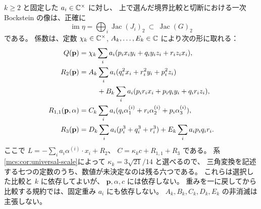 \begin{theorem}[一次像と七定数の比較形]
\label{lec:thm:seven-scalar-form}
$k\ge2$ と固定した $a_i\in\mathbb C^\times$ に対し、
上で選んだ境界比較と切断における一次 Bockstein の像は、正確に
\begin{equation}\label{lec:eq:bockstein-image}
             \operatorname{im}\eta
                =\bigoplus_i\operatorname{Jac}(J_i)_2
                \ \subset\ \operatorname{Jac}(G)_2
\end{equation}
である。
係数は、定数 $\chi_k\in\mathbb C^\times$, $A_k,\ldots,E_k\in\mathbb C$ により次の形に取れる：
\begin{align}
 Q(\mathbf p)
   &=\chi_k\sum_i a_i
       (p_ix_iy_i+q_iy_iz_i+r_iz_ix_i),\label{lec:eq:quadratic-image}\\
 R_2(\mathbf p)
   &=A_k\sum_i a_i(q_i^2x_i+r_i^2y_i+p_i^2z_i)\notag\\
   &\hspace{9mm}+B_k\sum_i a_i
       (p_ir_ix_i+p_iq_iy_i+q_ir_iz_i),\label{lec:eq:quadratic-correction}\\
 R_{1,1}(\mathbf p,\alpha)
   &=C_k\sum_i a_i
       (q_i\alpha_1^{(i)}+r_i\alpha_2^{(i)}+p_i\alpha_3^{(i)}),
       \label{lec:eq:mixed-correction}\\
 R_3(\mathbf p)
   &=D_k\sum_i a_i(p_i^3+q_i^3+r_i^3)
       +E_k\sum_i a_ip_iq_ir_i.\label{lec:eq:cubic-correction}
\end{align}
ここで $L=-\sum_i a_i\alpha^{(i)}\cdot x_i+R_2$、
$C=\kappa_kc+R_{1,1}+R_3$ である。
系\ref{mcs:cor:universal-scale}によって $\kappa_k=3\sqrt{21}/14$ と選べるので、
三角変換を記述する七つの定数のうち、数値が未決定なのは残る六つである。
これらは選択した比較と $k$ に依存してよいが、
$\mathbf p,\alpha,c$ には依存しない。
重みを一に戻してから比較する規約では、固定重み $a_i$ にも依存しない。
$A_k,B_k,C_k,D_k,E_k$ の非消滅は主張しない。
\end{theorem}

